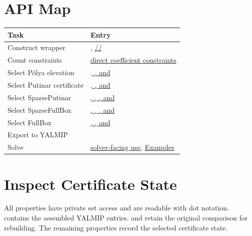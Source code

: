 \section{API Map}
\label{sec:pdlmi-lookup}

\begin{tabularx}{\textwidth}{@{}lY@{}}
\toprule
Task & Entry \\
\midrule
Construct wrapper &
\hyperref[sec:pdlmi-construction]{},
\hyperref[sec:pdvar-comparison]{\codeplain{<=}/\codeplain{>=}/\codeplain{==}} \\
Count constraints &
\hyperref[sec:pdlmi-direct]{direct coefficient constraints} \\
Select P\'olya elevation &
\hyperref[sec:pdlmi-polya]{, , and } \\
Select Putinar certificate &
\hyperref[sec:pdlmi-putinar]{, , and
} \\
Select SparsePutinar &
\hyperref[sec:pdlmi-sparse-putinar]{, , , and } \\
Select SparseFullBox &
\hyperref[sec:pdlmi-sparse-full-box]{, , , and } \\
Select FullBox &
\hyperref[sec:pdlmi-full-box]{, ,
and } \\
Export to YALMIP &
\hyperref[sec:pdlmi-toyalmip]{} \\
Solve &
\hyperref[sec:pdlmi-solver-use]{solver-facing use},
\hyperref[sec:examples]{Examples} \\
\bottomrule
\end{tabularx}

\section{Inspect Certificate State}

All  properties have private set access and are readable with dot notation.   contains the assembled YALMIP entries.  and  retain the original comparison for rebuilding.  The remaining properties record the selected certificate state.

